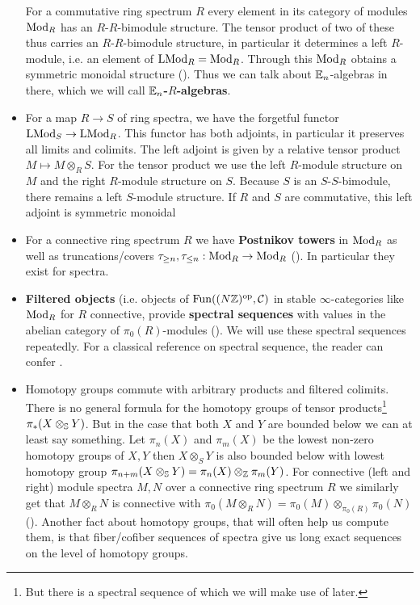 \begin{itemize}
    For a commutative ring spectrum $R$ every element in its category of modules $\Mod_R$ has an $R$-$R$-bimodule structure. The tensor product of two of these thus carries an $R$-$R$-bimodule structure, in particular it determines a left $R$-module, i.e. an element of $\LMod_R= \Mod_R$. Through this $\Mod_R$ obtains a symmetric monoidal structure (\cite[Theorem~4.5.2.1]{lurie2017higher}). Thus we can talk about $\En$-algebras in there, which we will call \textbf{$\En$-$R$-algebras}.
    \item For a map $R\to S$ of ring spectra, we have the forgetful functor $\LMod_S\to \LMod_R$. This functor has both adjoints, in particular it preserves all limits and colimits. The left adjoint is given by a relative tensor product $M\mapsto M\otimes_R S$. For the tensor product we use the left $R$-module structure on $M$ and the right $R$-module structure on $S$. Because $S$ is an $S$-$S$-bimodule, there remains a left $S$-module structure. If $R$ and $S$ are commutative, this left adjoint is symmetric monoidal \cite[Section~4.5.3]{lurie2017higher}
    \item For a connective ring spectrum $R$ we have \textbf{Postnikov towers} in $\Mod_R$ as well as truncations/covers $\tau_{\geq n},\tau_{\leq n}:\Mod_R\to \Mod_R$ (\cite[Proposition~7.1.1.13]{lurie2017higher}). In particular they exist for spectra.
    \item \textbf{Filtered objects} (i.e. objects of $\Fun((N\Z)^{\op},\cC)$ in stable $\infty$-categories like $\Mod_R$ for $R$ connective, provide \textbf{spectral sequences} with values in the abelian category of $\pi_0(R)$-modules (\cite[Section~1.2.2]{lurie2017higher}). 
    We will use these spectral sequences repeatedly.
    For a classical reference on spectral sequence, the reader can confer \cite[Chapter~5]{weibel1994introduction}.
    \item Homotopy groups commute with arbitrary products and filtered colimits. There is no general formula for the homotopy groups of tensor products\footnote{But there is a spectral sequence of which we will make use of later.} $\pi_*(X\otimes_\S Y)$. 
    But in the case that both $X$ and $Y$ are bounded below we can at least say something. Let $\pi_n(X)$ and $\pi_m(X)$ be the lowest non-zero homotopy groups of $X,Y$ then $X\otimes_S Y$ is also bounded below with lowest homotopy group $\pi_{n+m}(X\otimes_\S Y)=\pi_n(X)\otimes_\Z\pi_m(Y)$. 
    For connective (left and right) module spectra $M,N$ over a connective ring spectrum $R$ we similarly get that $M\otimes_R N$ is connective with $\pi_0(M\otimes_R N)=\pi_0(M)\otimes_{\pi_0(R)}\pi_0(N)$ (\cite[Corollary~7.2.1.23]{lurie2017higher}). Another fact about homotopy groups, that will often help us compute them, is that fiber/cofiber sequences of spectra give us long exact sequences on the level of homotopy groups.

\end{itemize}
